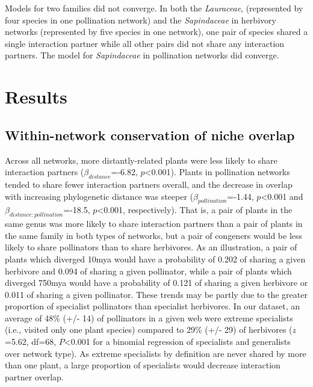 \documentclass[12pt]{article}
\begin{document}
\begin{spacing}{1.5}
    Models for two families did not converge. In both the \emph{Lauraceae}, (represented by four species in one pollination network) and the \emph{Sapindaceae} in herbivory networks (represented by five species in one network), one pair of species shared a single interaction partner while all other pairs did not share any interaction partners. The model for \emph{Sapindaceae} in pollination networks did converge.


\section*{Results}


  \subsection*{Within-network conservation of niche overlap} 

    Across all networks, more distantly-related plants were less likely to 
    share interaction partners ($\beta_{distance}$=-6.82, 
    $p$\textless0.001). Plants in pollination networks tended to share 
    fewer interaction partners overall, and the decrease in overlap with 
    increasing phylogenetic distance was steeper 
    ($\beta_{pollination}$=-1.44, $p$\textless0.001 and 
    $\beta_{distance:pollination}$=-18.5, $p$\textless0.001, respectively). 
    That is, a pair of plants in the same genus was more likely to share 
    interaction partners than a pair of plants in the same family in both 
    types of networks, but a pair of congeners would be less likely to 
    share pollinators than to share herbivores. As an illustration, a pair
    of plants which diverged 10mya would have a probability of 0.202 of sharing
    a given herbivore and 0.094 of sharing a given pollinator, while a 
    pair of plants which diverged 750mya would 
    have a probability of 0.121 of sharing a given herbivore or 
    0.011 of sharing a given pollinator.
    These trends may be partly 
    due to the greater proportion of specialist pollinators than specialist 
    herbivores. In our dataset, an average of 48\% (+/- 14) of pollinators 
    in a given web were extreme specialists (i.e., visited only one plant 
    species) compared to 29\% (+/- 29) of herbivores ($z$=5.62, df=68, 
    $P$\textless0.001 for a binomial regression of specialists and 
    generalists over network type). As extreme specialists by definition 
    are never shared by more than one plant, a large proportion of specialists
    would decrease interaction partner overlap.



\end{spacing}
\end{document}
